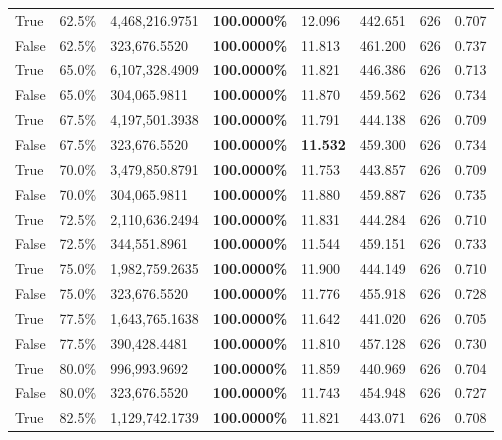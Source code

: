 \begin{table}[H]
\begin{tabular}{lllrllll}
\cline{1-8}
True & 62.5\% & 4,468,216.9751 & \bfseries \color{red} 100.0000\% & 12.096 & 442.651 & 626 & 0.707 \\
\cline{1-8}
False & 62.5\% & 323,676.5520 & \bfseries \color{red} 100.0000\% & 11.813 & 461.200 & 626 & 0.737 \\
\cline{1-8}
True & 65.0\% & 6,107,328.4909 & \bfseries \color{red} 100.0000\% & 11.821 & 446.386 & 626 & 0.713 \\
\cline{1-8}
False & 65.0\% & \color{red} 304,065.9811 & \bfseries \color{red} 100.0000\% & 11.870 & 459.562 & 626 & 0.734 \\
\cline{1-8}
True & 67.5\% & 4,197,501.3938 & \bfseries \color{red} 100.0000\% & 11.791 & 444.138 & 626 & 0.709 \\
\cline{1-8}
False & 67.5\% & 323,676.5520 & \bfseries \color{red} 100.0000\% & \bfseries \color{red} 11.532 & 459.300 & 626 & 0.734 \\
\cline{1-8}
True & 70.0\% & 3,479,850.8791 & \bfseries \color{red} 100.0000\% & 11.753 & 443.857 & 626 & 0.709 \\
\cline{1-8}
False & 70.0\% & \color{red} 304,065.9811 & \bfseries \color{red} 100.0000\% & 11.880 & 459.887 & 626 & 0.735 \\
\cline{1-8}
True & 72.5\% & 2,110,636.2494 & \bfseries \color{red} 100.0000\% & 11.831 & 444.284 & 626 & 0.710 \\
\cline{1-8}
False & 72.5\% & 344,551.8961 & \bfseries \color{red} 100.0000\% & 11.544 & 459.151 & 626 & 0.733 \\
\cline{1-8}
True & 75.0\% & 1,982,759.2635 & \bfseries \color{red} 100.0000\% & 11.900 & 444.149 & 626 & 0.710 \\
\cline{1-8}
False & 75.0\% & 323,676.5520 & \bfseries \color{red} 100.0000\% & 11.776 & 455.918 & 626 & 0.728 \\
\cline{1-8}
True & 77.5\% & 1,643,765.1638 & \bfseries \color{red} 100.0000\% & 11.642 & 441.020 & 626 & 0.705 \\
\cline{1-8}
False & 77.5\% & 390,428.4481 & \bfseries \color{red} 100.0000\% & 11.810 & 457.128 & 626 & 0.730 \\
\cline{1-8}
True & 80.0\% & 996,993.9692 & \bfseries \color{red} 100.0000\% & 11.859 & 440.969 & 626 & 0.704 \\
\cline{1-8}
False & 80.0\% & 323,676.5520 & \bfseries \color{red} 100.0000\% & 11.743 & 454.948 & 626 & 0.727 \\
\cline{1-8}
True & 82.5\% & 1,129,742.1739 & \bfseries \color{red} 100.0000\% & 11.821 & 443.071 & 626 & 0.708 \\

\end{tabular}
\end{table}
